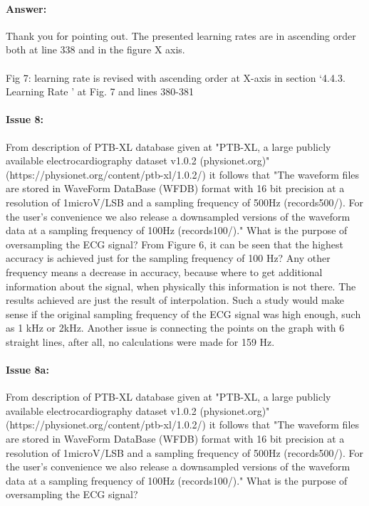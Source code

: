 \documentclass{article}
\begin{document}
\paragraph{Answer:}
Thank you for pointing out. The presented learning rates are in ascending order both at line 338 and in the figure X axis. \\\\

Fig 7: learning rate is revised with ascending order at X-axis in section `4.4.3. Learning Rate ' at Fig. 7 and lines 380-381

\paragraph{Issue 8:}
\begin{displayquote}
From description of PTB-XL database given at "PTB-XL, a large publicly available electrocardiography dataset v1.0.2 (physionet.org)" (https://physionet.org/content/ptb-xl/1.0.2/) it follows that "The waveform files are stored in WaveForm DataBase (WFDB) format with 16 bit precision at a resolution of 1microV/LSB and a sampling frequency of 500Hz (records500/). For the user’s convenience we also release a downsampled versions of the waveform data at a sampling frequency of 100Hz (records100/)." What is the purpose of oversampling the ECG signal? From Figure 6, it can be seen that the highest accuracy is achieved just for the sampling frequency of 100 Hz? Any other frequency means a decrease in accuracy, because where to get additional information about the signal, when physically this information is not there. The results achieved are just the result of interpolation. Such a study would make sense if the original sampling frequency of the ECG signal was high enough, such as 1 kHz or 2kHz. Another issue is connecting the points on the graph with 6 straight lines, after all, no calculations were made for 159 Hz.
\end{displayquote}

\paragraph{Issue 8a:}
\begin{displayquote}
From description of PTB-XL database given at "PTB-XL, a large publicly available electrocardiography dataset v1.0.2 (physionet.org)" (https://physionet.org/content/ptb-xl/1.0.2/) it follows that "The waveform files are stored in WaveForm DataBase (WFDB) format with 16 bit precision at a resolution of 1microV/LSB and a sampling frequency of 500Hz (records500/). For the user’s convenience we also release a downsampled versions of the waveform data at a sampling frequency of 100Hz (records100/)." What is the purpose of oversampling the ECG signal?
\end{displayquote}
\end{document}
